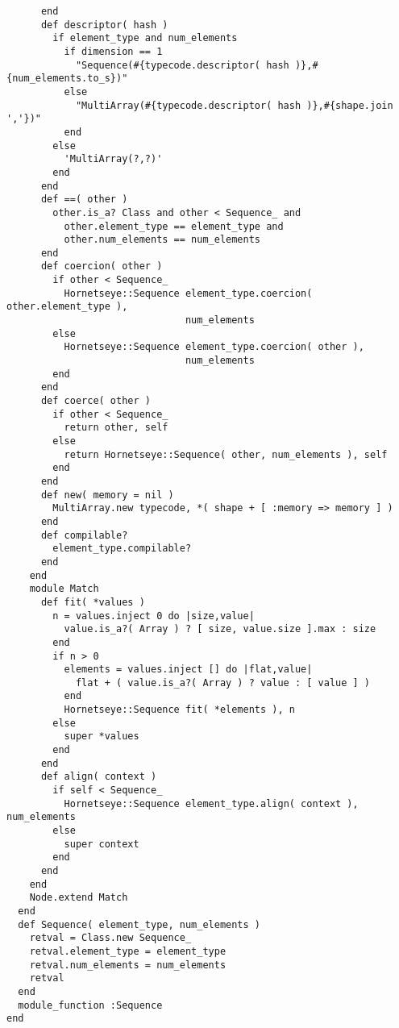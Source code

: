 \begin{lstlisting}
      end
      def descriptor( hash )
        if element_type and num_elements
          if dimension == 1
            "Sequence(#{typecode.descriptor( hash )},#{num_elements.to_s})"
          else
            "MultiArray(#{typecode.descriptor( hash )},#{shape.join ','})"
          end
        else
          'MultiArray(?,?)'
        end
      end
      def ==( other )
        other.is_a? Class and other < Sequence_ and
          other.element_type == element_type and
          other.num_elements == num_elements
      end
      def coercion( other )
        if other < Sequence_
          Hornetseye::Sequence element_type.coercion( other.element_type ),
                               num_elements
        else
          Hornetseye::Sequence element_type.coercion( other ),
                               num_elements
        end
      end
      def coerce( other )
        if other < Sequence_
          return other, self
        else
          return Hornetseye::Sequence( other, num_elements ), self
        end
      end
      def new( memory = nil )
        MultiArray.new typecode, *( shape + [ :memory => memory ] )
      end
      def compilable?
        element_type.compilable?
      end
    end
    module Match
      def fit( *values )
        n = values.inject 0 do |size,value|
          value.is_a?( Array ) ? [ size, value.size ].max : size
        end
        if n > 0
          elements = values.inject [] do |flat,value|
            flat + ( value.is_a?( Array ) ? value : [ value ] )
          end
          Hornetseye::Sequence fit( *elements ), n
        else
          super *values
        end
      end
      def align( context )
        if self < Sequence_
          Hornetseye::Sequence element_type.align( context ), num_elements
        else
          super context
        end
      end
    end
    Node.extend Match
  end
  def Sequence( element_type, num_elements )
    retval = Class.new Sequence_
    retval.element_type = element_type
    retval.num_elements = num_elements
    retval
  end
  module_function :Sequence
end
\end{lstlisting}
